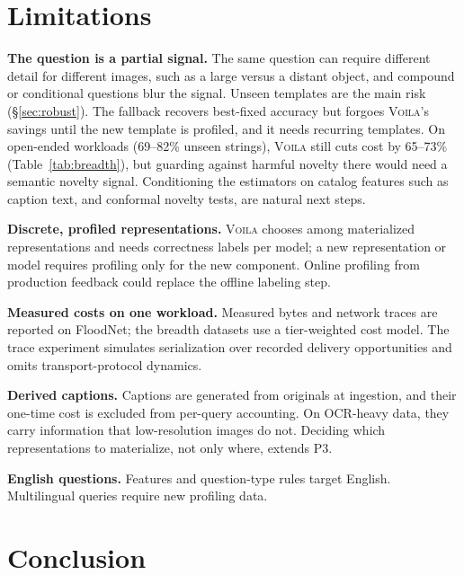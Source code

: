 \documentclass[10pt,conference]{IEEEtran}
\newcommand{\system}{\textsc{Voila}\xspace}
\begin{document}
\section{Limitations}
\label{sec:limits}

\textbf{The question is a partial signal.} The same question can require
different detail for different images, such as a large versus a distant
object, and compound or conditional questions blur the signal. Unseen
templates are the main risk (\S\ref{sec:robust}). The fallback recovers
best-fixed accuracy but forgoes \system's savings until the new template is
profiled, and it needs recurring templates. On open-ended workloads (69--82\%
unseen strings), \system still cuts cost by 65--73\% (Table~\ref{tab:breadth}),
but guarding against harmful novelty there would need a semantic novelty
signal. Conditioning the estimators on catalog features such as caption text,
and conformal novelty tests, are natural next steps.

\textbf{Discrete, profiled representations.} \system chooses among materialized
representations and needs correctness labels per model; a new representation
or model requires profiling only for the new component. Online profiling from
production feedback could replace the offline labeling step.

\textbf{Measured costs on one workload.} Measured bytes and network traces are
reported on FloodNet; the breadth datasets use a tier-weighted cost model. The
trace experiment simulates serialization over recorded delivery opportunities
and omits transport-protocol dynamics.

\textbf{Derived captions.} Captions are generated from originals at ingestion,
and their one-time cost is excluded from per-query accounting. On OCR-heavy
data, they carry information that low-resolution images do not. Deciding which
representations to materialize, not only where, extends P3.

\textbf{English questions.} Features and question-type rules target English.
Multilingual queries require new profiling data.

\section{Conclusion}
\end{document}
